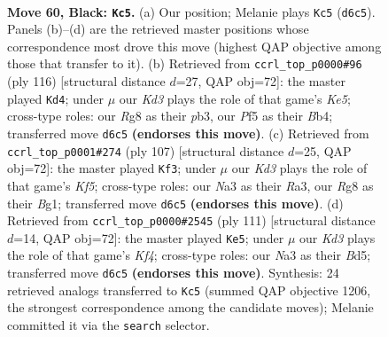 \documentclass[11pt]{article}
\begin{document}
\clearpage

\begin{figure}[p]\centering
\begin{subfigure}{0.46\textwidth}\centering
\resizebox{\linewidth}{!}{%
\newchessgame
\chessboard[
  setfen={6r1/3R4/Pp1k4/1B3p2/5P2/n2K4/8/8 b - - 4 60},
  showmover=false,
  pgfstyle=straightmove, color=movearrow, markmove={d6-c5}
]}
\caption{}
\end{subfigure}\hfill
\begin{subfigure}{0.46\textwidth}\centering
\resizebox{\linewidth}{!}{%
\newchessgame
\chessboard[
  setfen={1R6/5k2/4r3/4K3/1Bb1P3/1p6/1P6/8 w - - 26 59},
  showmover=false,
  pgfstyle=straightmove, color=movearrow, markmove={e5-d4}
]}
\caption{}
\end{subfigure}
\\[4pt]
\begin{subfigure}{0.46\textwidth}\centering
\resizebox{\linewidth}{!}{%
\newchessgame
\chessboard[
  setfen={8/8/8/1P6/4Rk2/r2B4/2K5/6b1 b - - 16 54},
  showmover=false,
  pgfstyle=straightmove, color=movearrow, markmove={f4-f3}
]}
\caption{}
\end{subfigure}\hfill
\begin{subfigure}{0.46\textwidth}\centering
\resizebox{\linewidth}{!}{%
\newchessgame
\chessboard[
  setfen={2r5/4B3/5R2/1p1b1k2/8/P6P/8/6K1 b - - 2 56},
  showmover=false,
  pgfstyle=straightmove, color=movearrow, markmove={f5-e5}
]}
\caption{}
\end{subfigure}
\caption{\textbf{Move 60, Black: \texttt{Kc5}.} (a) Our position; Melanie plays \texttt{Kc5} (\texttt{d6c5}). Panels (b)--(d) are the retrieved master positions whose correspondence most drove this move (highest QAP objective among those that transfer to it). (b) Retrieved from \texttt{ccrl\_top\_p0000\#96} (ply 116) [structural distance $d$=27, QAP obj=72]: the master played \texttt{Kd4}; under $\mu$ our \emph{Kd3} plays the role of that game's \emph{Ke5}; cross-type roles: our \emph{R}g8 as their \emph{p}b3, our \emph{P}f5 as their \emph{B}b4; transferred move \texttt{d6c5} \textbf{(endorses this move)}. (c) Retrieved from \texttt{ccrl\_top\_p0001\#274} (ply 107) [structural distance $d$=25, QAP obj=72]: the master played \texttt{Kf3}; under $\mu$ our \emph{Kd3} plays the role of that game's \emph{Kf5}; cross-type roles: our \emph{N}a3 as their \emph{R}a3, our \emph{R}g8 as their \emph{B}g1; transferred move \texttt{d6c5} \textbf{(endorses this move)}. (d) Retrieved from \texttt{ccrl\_top\_p0000\#2545} (ply 111) [structural distance $d$=14, QAP obj=72]: the master played \texttt{Ke5}; under $\mu$ our \emph{Kd3} plays the role of that game's \emph{Kf4}; cross-type roles: our \emph{N}a3 as their \emph{B}d5; transferred move \texttt{d6c5} \textbf{(endorses this move)}. Synthesis: 24 retrieved analogs transferred to \texttt{Kc5} (summed QAP objective 1206, the strongest correspondence among the candidate moves); Melanie committed it via the \texttt{search} selector.}
\label{fig:thought-m119}
\end{figure}
\end{document}
